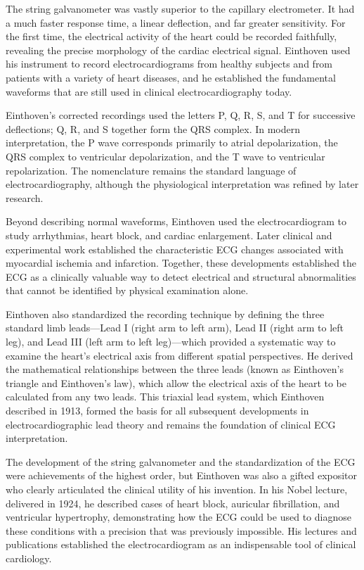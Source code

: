 The string galvanometer was vastly superior to the capillary electrometer. It had a much faster response time, a linear deflection, and far greater sensitivity. For the first time, the electrical activity of the heart could be recorded faithfully, revealing the precise morphology of the cardiac electrical signal. Einthoven used his instrument to record electrocardiograms from healthy subjects and from patients with a variety of heart diseases, and he established the fundamental waveforms that are still used in clinical electrocardiography today.

Einthoven's corrected recordings used the letters P, Q, R, S, and T for successive deflections; Q, R, and S together form the QRS complex. In modern interpretation, the P wave corresponds primarily to atrial depolarization, the QRS complex to ventricular depolarization, and the T wave to ventricular repolarization. The nomenclature remains the standard language of electrocardiography, although the physiological interpretation was refined by later research.\cite{einthoven-history}

Beyond describing normal waveforms, Einthoven used the electrocardiogram to study arrhythmias, heart block, and cardiac enlargement. Later clinical and experimental work established the characteristic ECG changes associated with myocardial ischemia and infarction. Together, these developments established the ECG as a clinically valuable way to detect electrical and structural abnormalities that cannot be identified by physical examination alone.\cite{einthoven-history}

Einthoven also standardized the recording technique by defining the three standard limb leads---Lead I (right arm to left arm), Lead II (right arm to left leg), and Lead III (left arm to left leg)---which provided a systematic way to examine the heart's electrical axis from different spatial perspectives. He derived the mathematical relationships between the three leads (known as Einthoven's triangle and Einthoven's law), which allow the electrical axis of the heart to be calculated from any two leads. This triaxial lead system, which Einthoven described in 1913, formed the basis for all subsequent developments in electrocardiographic lead theory and remains the foundation of clinical ECG interpretation.

The development of the string galvanometer and the standardization of the ECG were achievements of the highest order, but Einthoven was also a gifted expositor who clearly articulated the clinical utility of his invention. In his Nobel lecture, delivered in 1924, he described cases of heart block, auricular fibrillation, and ventricular hypertrophy, demonstrating how the ECG could be used to diagnose these conditions with a precision that was previously impossible. His lectures and publications established the electrocardiogram as an indispensable tool of clinical cardiology.

